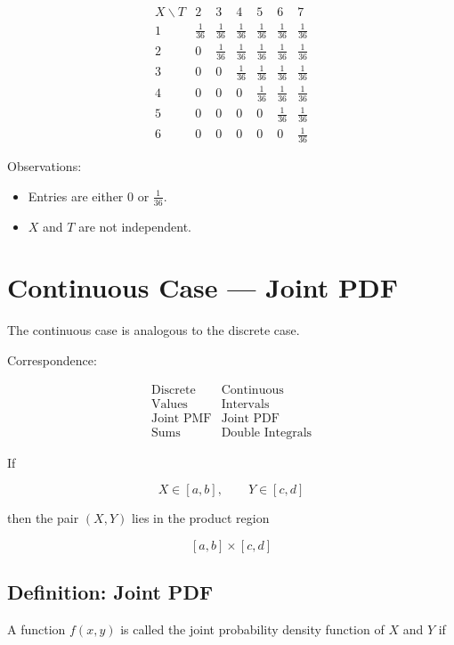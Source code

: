 \documentclass[11pt]{article}
\begin{document}
\[
\begin{array}{c|cccccc}
X\backslash T & 2 & 3 & 4 & 5 & 6 & 7 \\ \hline
1 & \frac{1}{36} & \frac{1}{36} & \frac{1}{36} & \frac{1}{36} & \frac{1}{36} & \frac{1}{36} \\
2 & 0 & \frac{1}{36} & \frac{1}{36} & \frac{1}{36} & \frac{1}{36} & \frac{1}{36} \\
3 & 0 & 0 & \frac{1}{36} & \frac{1}{36} & \frac{1}{36} & \frac{1}{36} \\
4 & 0 & 0 & 0 & \frac{1}{36} & \frac{1}{36} & \frac{1}{36} \\
5 & 0 & 0 & 0 & 0 & \frac{1}{36} & \frac{1}{36} \\
6 & 0 & 0 & 0 & 0 & 0 & \frac{1}{36}
\end{array}
\]

Observations:
\begin{itemize}[noitemsep]
\item Entries are either $0$ or $\frac{1}{36}$.
\item $X$ and $T$ are not independent.
\end{itemize}

\section{Continuous Case — Joint PDF}

The continuous case is analogous to the discrete case.

Correspondence:

\[
\begin{array}{c|c}
\text{Discrete} & \text{Continuous} \\
\hline
\text{Values} & \text{Intervals} \\
\text{Joint PMF} & \text{Joint PDF} \\
\text{Sums} & \text{Double Integrals}
\end{array}
\]

If

\[
X \in [a,b], \qquad Y \in [c,d]
\]

then the pair $(X,Y)$ lies in the product region

\[
[a,b] \times [c,d]
\]

\subsection{Definition: Joint PDF}

A function $f(x,y)$ is called the joint probability density function of $X$ and $Y$ if
\end{document}
